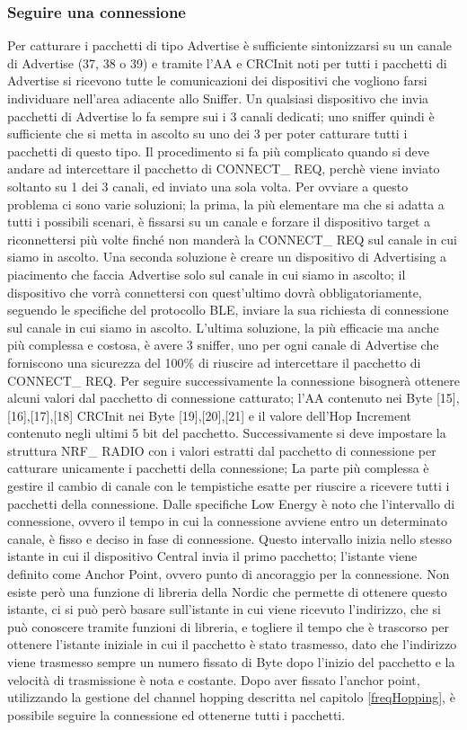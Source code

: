 \subsubsection{Seguire una connessione}
Per catturare i pacchetti di tipo Advertise è sufficiente sintonizzarsi su un canale di Advertise (37, 38 o 39) e tramite l'AA e CRCInit noti per tutti i pacchetti di Advertise si ricevono tutte le comunicazioni dei dispositivi che vogliono farsi individuare nell'area adiacente allo Sniffer. Un qualsiasi dispositivo che invia pacchetti di Advertise lo fa sempre sui i 3 canali dedicati; uno sniffer quindi è sufficiente che si metta in ascolto su uno dei 3 per poter catturare tutti i pacchetti di questo tipo. Il procedimento si fa più complicato quando si deve andare ad intercettare il pacchetto di CONNECT\_ REQ, perchè viene inviato soltanto su 1 dei 3 canali, ed inviato una sola volta.
Per ovviare a questo problema ci sono varie soluzioni; la prima, la più elementare ma che si adatta a tutti i possibili scenari, è fissarsi su un canale e forzare il dispositivo target a riconnettersi più volte finché non manderà la CONNECT\_ REQ sul canale in cui siamo in ascolto. Una seconda soluzione è creare un dispositivo di Advertising a piacimento che faccia Advertise solo sul canale in cui siamo in ascolto; il dispositivo che vorrà connettersi con quest'ultimo dovrà obbligatoriamente, seguendo le specifiche del protocollo BLE, inviare la sua richiesta di connessione sul canale in cui siamo in ascolto. L'ultima soluzione, la più efficacie ma anche più complessa e costosa, è avere 3 sniffer, uno per ogni canale di Advertise che forniscono una sicurezza del 100\% di riuscire ad intercettare il pacchetto di CONNECT\_ REQ.
Per seguire successivamente la connessione bisognerà ottenere alcuni valori dal pacchetto di connessione catturato; l'AA contenuto nei Byte [15],[16],[17],[18] CRCInit nei Byte [19],[20],[21] e il valore dell'Hop Increment contenuto negli ultimi 5 bit del pacchetto. Successivamente si deve impostare la struttura NRF\_ RADIO con i valori estratti dal pacchetto di connessione per catturare unicamente i pacchetti della connessione;
La parte più complessa è gestire il cambio di canale con le tempistiche esatte per riuscire a ricevere tutti i pacchetti della connessione. Dalle specifiche Low Energy è noto che l'intervallo di connessione, ovvero il tempo in cui la connessione avviene entro un determinato canale, è fisso e deciso in fase di connessione. Questo intervallo inizia nello stesso istante in cui il dispositivo Central invia il primo pacchetto; l'istante viene definito come Anchor Point, ovvero punto di ancoraggio per la connessione.
Non esiste però una funzione di libreria della Nordic che permette di ottenere questo istante, ci si può però basare sull'istante in cui viene ricevuto l'indirizzo, che si può conoscere tramite funzioni di libreria,  e togliere il tempo che è trascorso per ottenere l'istante iniziale in cui il pacchetto è stato trasmesso, dato che l'indirizzo viene trasmesso sempre un numero fissato di Byte dopo l'inizio del pacchetto e la velocità di trasmissione è nota e costante.
Dopo aver fissato l'anchor point, utilizzando la gestione del channel hopping descritta nel capitolo \ref{freqHopping}, è possibile seguire la connessione ed ottenerne tutti i pacchetti.

